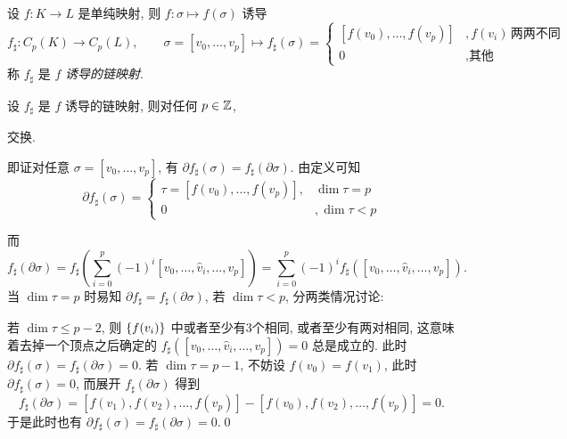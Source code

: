 	\begin{Definition}[(诱导)链映射]
		设 $ f : K\to L $ 是单纯映射, 则 $ f : \sigma\mapsto f(\sigma) $ 诱导
		\[
			f_\sharp : C_p(K)\to C_p(L),\qquad \sigma=[v_0,\dots,v_p]\mapsto f_\sharp(\sigma)=\begin{cases}
				[f(v_0),\dots,f(v_p)] & , f(v_i)\,\text{两两不同}\\ 0 & ,\text{其他}
			\end{cases}
		\]
		称 $ f_\sharp $ 是 $ f $ \emph{诱导的链映射}.
	\end{Definition}

	\begin{Lemma}
		设 $ f_\sharp $ 是 $ f $ 诱导的链映射, 则对任何 $ p\in\mathbb{Z} $,
		\begin{center}
		\end{center}
		交换.
	\end{Lemma}
	\begin{Proof}
		即证对任意 $ \sigma=[v_0,\dots,v_p] $, 有 $ \partial f_\sharp(\sigma)=f_\sharp(\partial\sigma) $. 由定义可知
		\[
			\partial f_\sharp(\sigma)=\begin{cases}
				\tau=[f(v_0),\dots,f(v_p)], & \dim \tau=p\\ 0 &,\dim\tau<p
			\end{cases}
		\]
	\end{Proof}
	而
	\[
		f_\sharp(\partial\sigma)=f_\sharp\left(\sum_{i=0}^p(-1)^i[v_0,\dots,\hat{v}_i,\dots,v_p]\right)=\sum_{i=0}^p(-1)^i f_\sharp([v_0,\dots,\hat{v}_i,\dots,v_p]).
	\]
	当 $ \dim\tau=p $ 时易知 $ \partial f_\sharp=f_\sharp(\partial\sigma) $, 若 $ \dim\tau<p $, 分两类情况讨论:

	若 $ \dim\tau\leqslant p-2 $, 则 $ \left\{ f(v_i) \right\} $ 中或者至少有3个相同, 或者至少有两对相同, 这意味着去掉一个顶点之后确定的 $ f_\sharp([v_0,\dots,\hat{v}_i,\dots,v_p])=0 $ 总是成立的. 此时 $ \partial f_\sharp(\sigma)=f_\sharp(\partial\sigma)=0 $. 若 $ \dim\tau=p-1 $, 不妨设 $ f(v_0)=f(v_1) $, 此时 $ \partial f_\sharp(\sigma)=0 $, 而展开 $ f_\sharp(\partial\sigma) $ 得到
	\[
		f_\sharp(\partial\sigma)=[f(v_1),f(v_2),\dots,f(v_p)]-[f(v_0),f(v_2),\dots,f(v_p)]=0.
	\]
	于是此时也有 $ \partial f_\sharp(\sigma)=f_\sharp(\partial\sigma)=0 $.\qed

